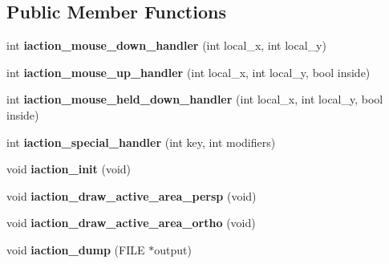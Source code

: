 \subsection*{Public Member Functions}
\begin{DoxyCompactItemize}
\item 
\hypertarget{classGLUI__Rotation_a3af15515b4f2bd05bfbbc625fa4d6247}{int {\bfseries iaction\-\_\-mouse\-\_\-down\-\_\-handler} (int local\-\_\-x, int local\-\_\-y)}\label{classGLUI__Rotation_a3af15515b4f2bd05bfbbc625fa4d6247}

\item 
\hypertarget{classGLUI__Rotation_aa3ee9f07c589dedc7c1b6ad780566172}{int {\bfseries iaction\-\_\-mouse\-\_\-up\-\_\-handler} (int local\-\_\-x, int local\-\_\-y, bool inside)}\label{classGLUI__Rotation_aa3ee9f07c589dedc7c1b6ad780566172}

\item 
\hypertarget{classGLUI__Rotation_ad743bdbd88648859ef334c572e9e969d}{int {\bfseries iaction\-\_\-mouse\-\_\-held\-\_\-down\-\_\-handler} (int local\-\_\-x, int local\-\_\-y, bool inside)}\label{classGLUI__Rotation_ad743bdbd88648859ef334c572e9e969d}

\item 
\hypertarget{classGLUI__Rotation_a0a86badfaa9102475a2af2b2f3d824aa}{int {\bfseries iaction\-\_\-special\-\_\-handler} (int key, int modifiers)}\label{classGLUI__Rotation_a0a86badfaa9102475a2af2b2f3d824aa}

\item 
\hypertarget{classGLUI__Rotation_ac7029bd29427238e2590472ae882c258}{void {\bfseries iaction\-\_\-init} (void)}\label{classGLUI__Rotation_ac7029bd29427238e2590472ae882c258}

\item 
\hypertarget{classGLUI__Rotation_a88cf2f55e52c4afc9a81fceb53dbc406}{void {\bfseries iaction\-\_\-draw\-\_\-active\-\_\-area\-\_\-persp} (void)}\label{classGLUI__Rotation_a88cf2f55e52c4afc9a81fceb53dbc406}

\item 
\hypertarget{classGLUI__Rotation_aea8411d09fec628a8af788b0998746f2}{void {\bfseries iaction\-\_\-draw\-\_\-active\-\_\-area\-\_\-ortho} (void)}\label{classGLUI__Rotation_aea8411d09fec628a8af788b0998746f2}

\item 
\hypertarget{classGLUI__Rotation_a6792c8f6fd8d2e52dd1e7729f7679fba}{void {\bfseries iaction\-\_\-dump} (F\-I\-L\-E $\ast$output)}\label{classGLUI__Rotation_a6792c8f6fd8d2e52dd1e7729f7679fba}


\end{DoxyCompactItemize}
